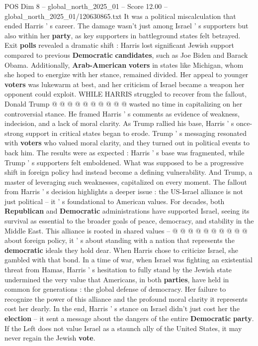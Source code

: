 \begin{textsample}{POS Dim 8 – global\_north\_2025\_01 – Score 12.00 – global\_north\_2025\_01/120630865.txt}
It was a political miscalculation that ended Harris ' s career.
The damage wasn't just among Israel ' s supporters but also within her \textbf{party}, as key supporters in battleground states felt betrayed.
Exit \textbf{polls} revealed a dramatic shift : Harris lost significant Jewish support compared to previous \textbf{Democratic} \textbf{candidates}, such as Joe Biden and Barack Obama.
Additionally, \textbf{Arab-American} \textbf{voters} in states like Michigan, whom she hoped to energize with her stance, remained divided.
Her appeal to younger \textbf{voters} was lukewarm at best, and her criticism of Israel became a weapon her opponent could exploit.
WHILE HARRIS struggled to recover from the fallout, Donald Trump @ @ @ @ @ @ @ @ @ @ wasted no time in capitalizing on her controversial stance.
He framed Harris ' s comments as evidence of weakness, indecision, and a lack of moral clarity.
As Trump rallied his base, Harris ' s once-strong support in critical states began to erode.
Trump ' s messaging resonated with \textbf{voters} who valued moral clarity, and they turned out in political events to back him.
The results were as expected : Harris ' s base was fragmented, while Trump ' s supporters felt emboldened.
What was supposed to be a progressive shift in foreign policy had instead become a defining vulnerability.
And Trump, a master of leveraging such weaknesses, capitalized on every moment.
The fallout from Harris ' s decision highlights a deeper issue : the US-Israel alliance is not just political -- it ' s foundational to American values.
For decades, both \textbf{Republican} and \textbf{Democratic} administrations have supported Israel, seeing its survival as essential to the broader goals of peace, democracy, and stability in the Middle East.
This alliance is rooted in shared values -- @ @ @ @ @ @ @ @ @ @ about foreign policy, it ' s about standing with a nation that represents the \textbf{democratic} ideals they hold dear.
When Harris chose to criticize Israel, she gambled with that bond.
In a time of war, when Israel was fighting an existential threat from Hamas, Harris ' s hesitation to fully stand by the Jewish state undermined the very value that Americans, in both \textbf{parties}, have held in common for generations : the global defense of democracy.
Her failure to recognize the power of this alliance and the profound moral clarity it represents cost her dearly.
In the end, Harris ' s stance on Israel didn't just cost her the \textbf{election} -- it sent a message about the dangers of the entire \textbf{Democratic} \textbf{party}.
If the Left does not value Israel as a staunch ally of the United States, it may never regain the Jewish \textbf{vote}.

\end{textsample}
